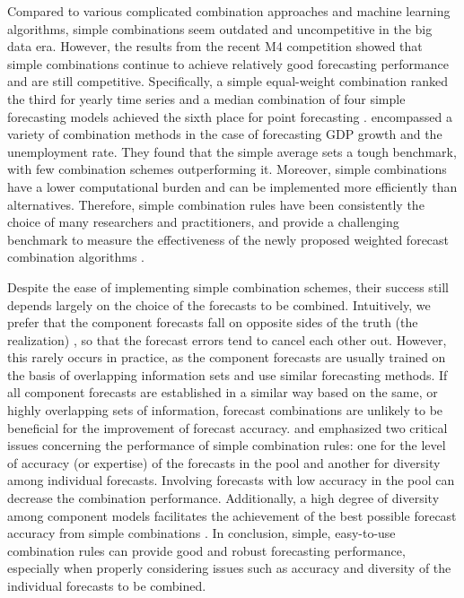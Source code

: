 \documentclass[11pt]{article}
\begin{document}
Compared to various complicated combination approaches and machine learning algorithms, simple combinations seem outdated and uncompetitive in the big data era. However, the results from the recent M4 competition \citep{Makridakis2020-hu} showed that simple combinations continue to achieve relatively good forecasting performance and are still competitive. Specifically, a simple equal-weight combination ranked the third for yearly time series \citep{Shaub2019-on} and a median combination of four simple forecasting models achieved the sixth place for point forecasting \citep{Petropoulos2020-fp}. \citet{Genre2013-ut} encompassed a variety of combination methods in the case of forecasting GDP growth and the unemployment rate. They found that the simple average sets a tough benchmark, with few combination schemes outperforming it. Moreover, simple combinations have a lower computational burden and can be implemented more efficiently than alternatives. Therefore, simple combination rules have been consistently the choice of many researchers and practitioners, and provide a challenging benchmark to measure the effectiveness of the newly proposed weighted forecast combination algorithms \citep[e.g.,][]{Makridakis2000-he,Stock2004-rq,Makridakis2020-hu,Montero-Manso2020-tq,Kang2020-rl,Wang2021-un}.

Despite the ease of implementing simple combination schemes, their success still depends largely on the choice of the forecasts to be combined. Intuitively, we prefer that the component forecasts fall on opposite sides of the truth (the realization) \citep{Bates1969-yj,Larrick2006-sr}, so that the forecast errors tend to cancel each other out. However, this rarely occurs in practice, as the component forecasts are usually trained on the basis of overlapping information sets and use similar forecasting methods. If all component forecasts are established in a similar way based on the same, or highly overlapping sets of information, forecast combinations are unlikely to be beneficial for the improvement of forecast accuracy. \citet{Mannes2014-dl} and \citet{Lichtendahl2020-ut} emphasized two critical issues concerning the performance of simple combination rules: one for the level of accuracy (or expertise) of the forecasts in the pool and another for diversity among individual forecasts. Involving forecasts with low accuracy in the pool can decrease the combination performance. Additionally, a high degree of diversity among component models facilitates the achievement of the best possible forecast accuracy from simple combinations \citep{Thomson2019-al}. In conclusion, simple, easy-to-use combination rules can provide good and robust forecasting performance, especially when properly considering issues such as accuracy and diversity of the individual forecasts to be combined.
\end{document}
